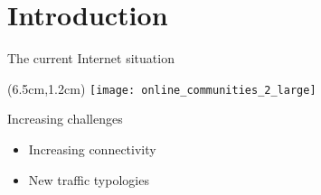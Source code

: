 \section{Introduction}
\begin{frame}{The current Internet situation}
  \begin{textblock*}{5cm}(6.5cm,1.2cm)
    \texttt{[image: online\_communities\_2\_large]}
  \end{textblock*}

  Increasing challenges
  \begin{itemize}
  \item<1-> Increasing connectivity
  \item<2-> New traffic typologies 
  \end{itemize}
\end{frame}
